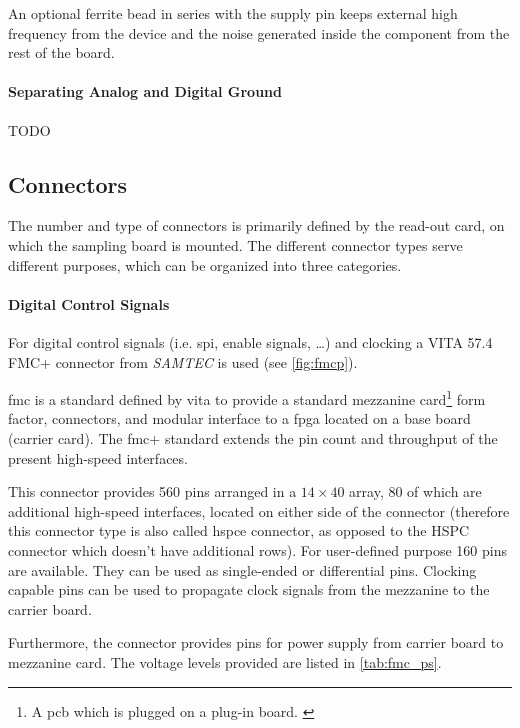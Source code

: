 An optional ferrite bead in series with the supply pin keeps external high frequency from the device and the noise generated inside the component from the rest of the board. \cite{decouple}

\paragraph{Separating Analog and Digital Ground}
TODO

\subsection{Connectors}\label{sec:connectors}
The number and type of connectors is primarily defined by the read-out card, on which the sampling board is mounted.
The different connector types serve different purposes, which can be organized into three categories.

\paragraph{Digital Control Signals}
For digital control signals (i.e. \gls{spi}, enable signals, \ldots) and clocking a VITA 57.4 FMC+ connector from \textit{SAMTEC} is used (see \autoref{fig:fmcp}). 

\gls{fmc} is a standard defined by \gls{vita} to provide a standard mezzanine card\footnote{A \gls{pcb} which is plugged on a plug-in board. \cite{mezzanine}} form factor, connectors, and modular interface to a \gls{fpga} located on a base board (carrier card). \cite{Seelam2009}
The \gls{fmc}+ standard extends the pin count and throughput of the present high-speed interfaces. 

This connector provides 560 pins arranged in a $14\times40$ array, 80 of which are additional high-speed interfaces, located on either side of the connector (therefore this connector type is also called \gls{hspce} connector, as opposed to the HSPC connector which doesn't have additional rows).
For user-defined purpose 160 pins are available. 
They can be used as single-ended or differential pins.
Clocking capable pins can be used to propagate clock signals from the mezzanine to the carrier board. 

Furthermore, the connector provides pins for power supply from carrier board to mezzanine card. \cite{fmc} The voltage levels provided are listed in \autoref{tab:fmc_ps}.



